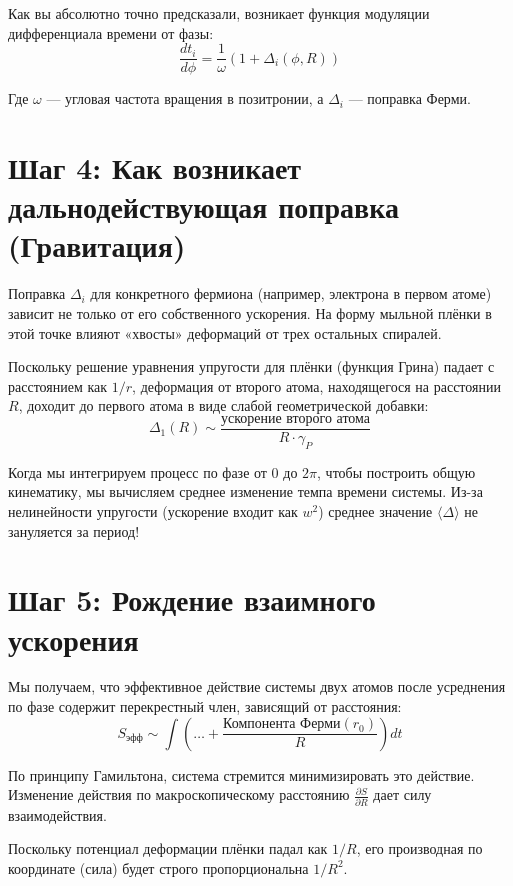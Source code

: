 \documentclass[12pt,a4paper]{article}
\begin{document}
Как вы абсолютно точно предсказали, возникает функция модуляции дифференциала времени от фазы:
\begin{equation}
\frac{dt_i}{d\phi} = \frac{1}{\omega} \left( 1 + \Delta_i(\phi, R) \right)
\end{equation}

Где $\omega$ — угловая частота вращения в позитронии, а $\Delta_i$ — поправка Ферми.

\section*{Шаг 4: Как возникает дальнодействующая поправка (Гравитация)}

Поправка $\Delta_i$ для конкретного фермиона (например, электрона в первом атоме) зависит не только от его собственного ускорения. На форму мыльной плёнки в этой точке влияют «хвосты» деформаций от трех остальных спиралей.

Поскольку решение уравнения упругости для плёнки (функция Грина) падает с расстоянием как $1/r$, деформация от второго атома, находящегося на расстоянии $R$, доходит до первого атома в виде слабой геометрической добавки:
\begin{equation}
\Delta_{1}(R) \sim \frac{\text{ускорение второго атома}}{R \cdot \gamma_P}
\end{equation}

Когда мы интегрируем процесс по фазе от $0$ до $2\pi$, чтобы построить общую кинематику, мы вычисляем среднее изменение темпа времени системы. Из-за нелинейности упругости (ускорение входит как $w^2$) среднее значение $\langle \Delta \rangle$ не зануляется за период!

\section*{Шаг 5: Рождение взаимного ускорения}

Мы получаем, что эффективное действие системы двух атомов после усреднения по фазе содержит перекрестный член, зависящий от расстояния:
\begin{equation}
S_{эфф} \sim \int \left( \dots + \frac{\text{Компонента Ферми}(r_0)}{R} \right) dt
\end{equation}

По принципу Гамильтона, система стремится минимизировать это действие. Изменение действия по макроскопическому расстоянию $\frac{\partial S}{\partial R}$ дает силу взаимодействия.

Поскольку потенциал деформации плёнки падал как $1/R$, его производная по координате (сила) будет строго пропорциональна $1/R^2$.
\end{document}

